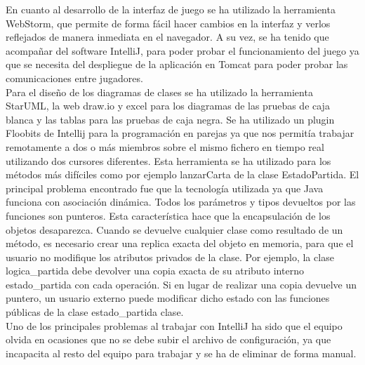 En cuanto al desarrollo de la interfaz de juego se ha utilizado la herramienta WebStorm, que permite de forma fácil hacer cambios en la interfaz y verlos reflejados de manera inmediata en el navegador. A su vez, se ha tenido que acompañar del software IntelliJ, para poder probar el funcionamiento del juego ya que se necesita del despliegue de la aplicación en Tomcat para poder probar las comunicaciones entre jugadores.
\\
Para el diseño de los diagramas de clases se ha utilizado la herramienta StarUML, la web draw.io y excel para los diagramas de las pruebas de caja blanca y las tablas para las pruebas de caja negra.
Se ha utilizado un plugin Floobits de Intellij para la programación en parejas ya que nos permitía trabajar remotamente a dos o más miembros sobre el mismo fichero en tiempo real utilizando dos cursores diferentes. Esta herramienta se ha utilizado para los métodos más difíciles como por ejemplo lanzarCarta de la clase EstadoPartida.
El principal problema encontrado fue que la tecnología utilizada ya que Java funciona con asociación dinámica. Todos los parámetros y tipos devueltos por las funciones son punteros. Esta característica hace que la encapsulación de los objetos desaparezca. Cuando se devuelve cualquier clase como resultado de un método, es necesario crear una replica exacta del objeto en memoria, para que el usuario no modifique los atributos privados de la clase. Por ejemplo, la clase logica\_partida debe devolver una copia exacta de su atributo interno estado\_partida con cada operación. Si en lugar de realizar una copia devuelve un puntero, un usuario externo puede modificar dicho estado con las funciones públicas de la clase estado\_partida clase.
\\
Uno de los principales problemas al trabajar con IntelliJ ha sido que el equipo olvida en ocasiones que no se debe subir el archivo de configuración, ya que incapacita al resto del equipo para trabajar y se ha de eliminar de forma manual.

